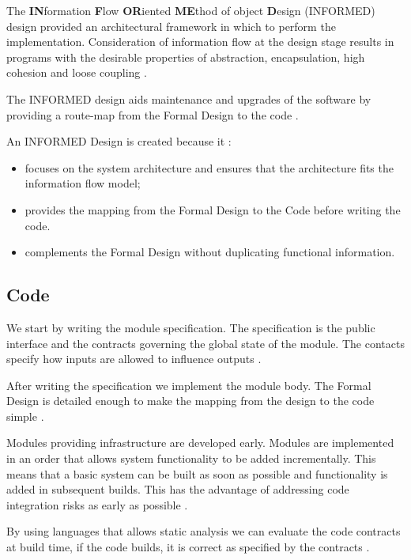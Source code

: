 The \textbf{IN}formation \textbf{F}low \textbf{OR}iented \textbf{ME}thod of
object \textbf{D}esign (INFORMED) design provided an architectural framework
in which to perform the implementation. Consideration of information flow at the
design stage results in programs with the desirable properties of abstraction, 
encapsulation, high cohesion and loose coupling \parencite{Tokeneer}.

The INFORMED design aids maintenance and upgrades of the software by providing a
route-map from the Formal Design to the code \parencite{Tokeneer}.

An INFORMED Design is created because it \parencite{Tokeneer}:
\begin{itemize}
	\item focuses on the system architecture and ensures that the architecture 
		fits the information flow model;
	\item provides the mapping from the Formal Design to the Code before writing
		the code.
	\item complements the Formal Design without duplicating functional information.
\end{itemize}

\subsection{Code}
We start by writing the module specification. The specification is the public 
interface and the contracts governing the global state of the module. The contacts
specify how inputs are allowed to influence outputs \parencite{Tokeneer}. 

After writing the specification we implement the module body. The Formal Design is
detailed enough to make the mapping from the design to the code simple 
\parencite{Tokeneer}.

Modules providing infrastructure are developed early. Modules are implemented 
in an order that allows system functionality to be added incrementally. This
means that a basic system can be built as soon as possible and functionality is 
added in subsequent builds. This has the advantage of addressing code integration
risks as early as possible \parencite{Tokeneer}.

By using languages that allows static analysis we can evaluate the code 
contracts at build time, if the code builds, it is correct as specified by the
contracts \parencite{Tokeneer}.